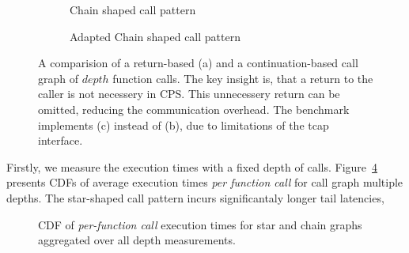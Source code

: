 \begin{figure}[ht]
\begin{subfigure}[b]{0.3\textwidth}
         \caption{\label{fig:chain-ideal}Chain shaped call pattern}
    \end{subfigure}
    \hfill
   \begin{subfigure}[b]{0.3\textwidth}
         \centering
         \caption{\label{fig:chain-real}Adapted Chain shaped call pattern}
    \end{subfigure}
  \caption{\label{fig:call-graphs} A comparision of a return-based (a) and a continuation-based call graph of $depth$ function calls. The key insight is, that a return to the caller is not necessery in \ac{CPS}. This unnecessery return can be omitted, reducing the communication overhead. The benchmark implements (c) instead of (b), due to limitations of the tcap interface.}
\end{figure}

Firstly, we measure the execution times with a fixed depth of calls. Figure~\ref{fig:eval-star-chain-distribution} presents \acp{CDF} of average execution times \emph{per function call} for call graph multiple depths. The star-shaped call pattern incurs significantaly longer tail latencies,
\begin{figure}[H]
  \centering
    \resizebox{\textwidth}{!}{
      
    }
  \caption{\label{fig:eval-star-chain-distribution} \ac{CDF} of \emph{per-function call} execution times for star and chain graphs aggregated over all depth measurements.}
\end{figure}


